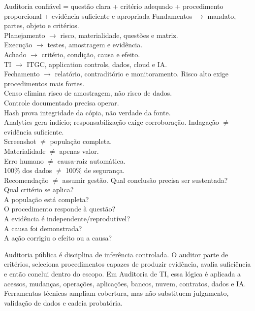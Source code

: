{Auditoria confiável = questão clara + critério adequado + procedimento proporcional + evidência suficiente e apropriada}
{Fundamentos $\rightarrow$ mandato, partes, objeto e critérios.\\Planejamento $\rightarrow$ risco, materialidade, questões e matriz.\\Execução $\rightarrow$ testes, amostragem e evidência.\\Achado $\rightarrow$ critério, condição, causa e efeito.\\TI $\rightarrow$ ITGC, application controls, dados, cloud e IA.\\Fechamento $\rightarrow$ relatório, contraditório e monitoramento.}
{Risco alto exige procedimentos mais fortes.\\Censo elimina risco de amostragem, não risco de dados.\\Controle documentado precisa operar.\\Hash prova integridade da cópia, não verdade da fonte.\\Analytics gera indício; responsabilização exige corroboração.}
{Indagação $\neq$ evidência suficiente.\\Screenshot $\neq$ população completa.\\Materialidade $\neq$ apenas valor.\\Erro humano $\neq$ causa-raiz automática.\\100\% dos dados $\neq$ 100\% de segurança.\\Recomendação $\neq$ assumir gestão.}
{Qual conclusão precisa ser sustentada?\\Qual critério se aplica?\\A população está completa?\\O procedimento responde à questão?\\A evidência é independente/reprodutível?\\A causa foi demonstrada?\\A ação corrigiu o efeito ou a causa?}

\begin{resumo}
Auditoria pública é disciplina de inferência controlada. O auditor parte de critérios, seleciona procedimentos capazes de produzir evidência, avalia suficiência e então conclui dentro do escopo. Em Auditoria de TI, essa lógica é aplicada a acessos, mudanças, operações, aplicações, bancos, nuvem, contratos, dados e IA. Ferramentas técnicas ampliam cobertura, mas não substituem julgamento, validação de dados e cadeia probatória.
\end{resumo}
